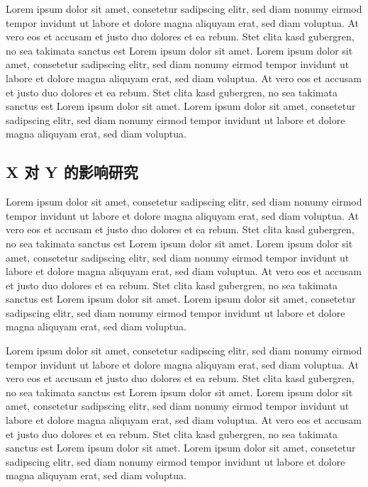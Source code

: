 \documentclass[]{WTUthesis}
\begin{document}
	Lorem ipsum dolor sit amet, consetetur sadipscing elitr, sed diam nonumy eirmod tempor invidunt ut labore et dolore magna aliquyam erat, sed diam voluptua. At vero eos et accusam et justo duo dolores et ea rebum. Stet clita kasd gubergren, no sea takimata sanctus est Lorem ipsum dolor sit amet. Lorem ipsum dolor sit amet, consetetur sadipscing elitr, sed diam nonumy eirmod tempor invidunt ut labore et dolore magna aliquyam erat, sed diam voluptua. At vero eos et accusam et justo duo dolores et ea rebum. Stet clita kasd gubergren, no sea takimata sanctus est Lorem ipsum dolor sit amet. Lorem ipsum dolor sit amet, consetetur sadipscing elitr, sed diam nonumy eirmod tempor invidunt ut labore et dolore magna aliquyam erat, sed diam voluptua.
	
	\subsection{X 对 Y 的影响研究}
	Lorem ipsum dolor sit amet, consetetur sadipscing elitr, sed diam nonumy eirmod tempor invidunt ut labore et dolore magna aliquyam erat, sed diam voluptua. At vero eos et accusam et justo duo dolores et ea rebum. Stet clita kasd gubergren, no sea takimata sanctus est Lorem ipsum dolor sit amet. Lorem ipsum dolor sit amet, consetetur sadipscing elitr, sed diam nonumy eirmod tempor invidunt ut labore et dolore magna aliquyam erat, sed diam voluptua. At vero eos et accusam et justo duo dolores et ea rebum. Stet clita kasd gubergren, no sea takimata sanctus est Lorem ipsum dolor sit amet. Lorem ipsum dolor sit amet, consetetur sadipscing elitr, sed diam nonumy eirmod tempor invidunt ut labore et dolore magna aliquyam erat, sed diam voluptua.
	
	\newpage
	
	Lorem ipsum dolor sit amet, consetetur sadipscing elitr, sed diam nonumy eirmod tempor invidunt ut labore et dolore magna aliquyam erat, sed diam voluptua. At vero eos et accusam et justo duo dolores et ea rebum. Stet clita kasd gubergren, no sea takimata sanctus est Lorem ipsum dolor sit amet. Lorem ipsum dolor sit amet, consetetur sadipscing elitr, sed diam nonumy eirmod tempor invidunt ut labore et dolore magna aliquyam erat, sed diam voluptua. At vero eos et accusam et justo duo dolores et ea rebum. Stet clita kasd gubergren, no sea takimata sanctus est Lorem ipsum dolor sit amet. Lorem ipsum dolor sit amet, consetetur sadipscing elitr, sed diam nonumy eirmod tempor invidunt ut labore et dolore magna aliquyam erat, sed diam voluptua.
	
\end{document}
